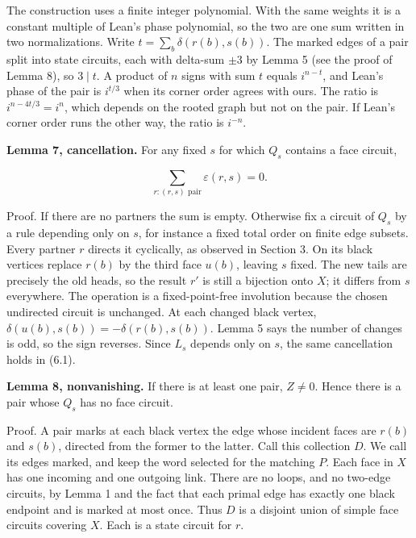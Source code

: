 \documentclass[a4paper,11pt]{amsart}
\begin{document}
The construction uses a finite integer polynomial. With the same weights it is a constant multiple of Lean's phase polynomial, so the two are one sum written in two normalizations. Write $t=\sum_b\delta(r(b),\allowbreak s(b))$. The marked edges of a pair split into state circuits, each with delta-sum $\pm3$ by Lemma 5 (see the proof of Lemma 8), so $3\mid t$. A product of $n$ signs with sum $t$ equals $i^{n-t}$, and Lean's phase of the pair is $i^{t/3}$ when its corner order agrees with ours. The ratio is $i^{n-4t/3}=i^n$, which depends on the rooted graph but not on the pair. If Lean's corner order runs the other way, the ratio is $i^{-n}$.

\textbf{Lemma 7, cancellation.} For any fixed $s$ for which $Q_s$ contains a face circuit,

\begin{equation*}
\sum_{r:(r,s)\text{ pair}}\varepsilon(r,s)=0.                      \tag{6.2}
\end{equation*}

Proof. If there are no partners the sum is empty. Otherwise fix a circuit of $Q_s$ by a rule depending only on $s$, for instance a fixed total order on finite edge subsets. Every partner $r$ directs it cyclically, as observed in Section 3. On its black vertices replace $r(b)$ by the third face $u(b)$, leaving $s$ fixed. The new tails are precisely the old heads, so the result $r'$ is still a bijection onto $X$; it differs from $s$ everywhere. The operation is a fixed-point-free involution because the chosen undirected circuit is unchanged. At each changed black vertex, $\delta(u(b),\allowbreak s(b))=-\delta(r(b),\allowbreak s(b))$. Lemma 5 says the number of changes is odd, so the sign reverses. Since $L_s$ depends only on $s$, the same cancellation holds in (6.1).

\textbf{Lemma 8, nonvanishing.} If there is at least one pair, $Z\ne0$. Hence there is a pair whose $Q_s$ has no face circuit.

Proof. A pair marks at each black vertex the edge whose incident faces are $r(b)$ and $s(b)$, directed from the former to the latter. Call this collection $D$. We call its edges marked, and keep the word selected for the matching $P$. Each face in $X$ has one incoming and one outgoing link. There are no loops, and no two-edge circuits, by Lemma 1 and the fact that each primal edge has exactly one black endpoint and is marked at most once. Thus $D$ is a disjoint union of simple face circuits covering $X$. Each is a state circuit for $r$.
\end{document}
